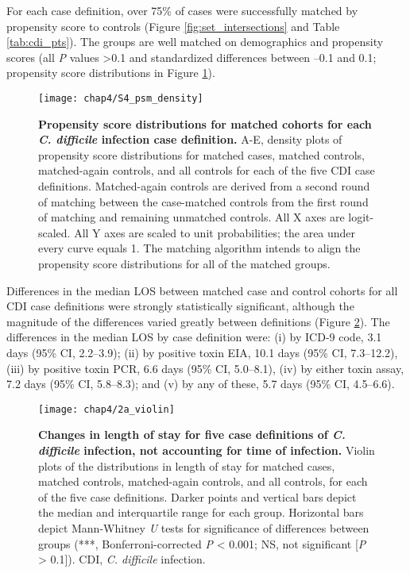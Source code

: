 For each case definition, over 75\% of cases were successfully matched by propensity score to controls (Figure \ref{fig:set_intersections} and Table \ref{tab:cdi_pts}). The groups are well matched on demographics and propensity scores (all \emph{P} values >0.1 and standardized differences between –0.1 and 0.1; propensity score distributions in Figure \ref{fig:psm_density}).
\begin{figure}[htb]
  \texttt{[image: chap4/S4\_psm\_density]}
  \caption[Propensity score distributions for matched cohorts for each \emph{C. difficile} infection case definition]{
    \textbf{Propensity score distributions for matched cohorts for each \emph{C. difficile} infection case definition.} A-E, density plots of propensity score distributions for matched cases, matched controls, matched-again controls, and all controls for each of the five CDI case definitions. Matched-again controls are derived from a second round of matching between the case-matched controls from the first round of matching and remaining unmatched controls. All X axes are logit-scaled. All Y axes are scaled to unit probabilities; the area under every curve equals 1. The matching algorithm intends to align the propensity score distributions for all of the matched groups.
  }
  \label{fig:psm_density}
\end{figure}
Differences in the median LOS between matched case and control cohorts for all CDI case definitions were strongly statistically significant, although the magnitude of the differences varied greatly between definitions (Figure \ref{fig:violin}). The differences in the median LOS by case definition were: (i) by ICD-9 code, 3.1 days (95\% CI, 2.2–3.9); (ii) by positive toxin EIA, 10.1 days (95\% CI, 7.3–12.2), (iii) by positive toxin PCR, 6.6 days (95\% CI, 5.0–8.1), (iv) by either toxin assay, 7.2 days (95\% CI, 5.8–8.3); and (v) by any of these, 5.7 days (95\% CI, 4.5–6.6). 
\begin{figure}[htb]
  \texttt{[image: chap4/2a\_violin]}
  \caption[Changes in length of stay for five case definitions of \emph{C. difficile} infection, not accounting for time of infection]{
    \textbf{Changes in length of stay for five case definitions of \emph{C. difficile} infection, not accounting for time of infection.} Violin plots of the distributions in length of stay for matched cases, matched controls, matched-again controls, and all controls, for each of the five case definitions. Darker points and vertical bars depict the median and interquartile range for each group. Horizontal bars depict Mann-Whitney \emph{U} tests for significance of differences between groups (***, Bonferroni-corrected \emph{P} < 0.001; NS, not significant [\emph{P} > 0.1]). CDI, \emph{C. difficile} infection.
  }
  \label{fig:violin}
\end{figure}

